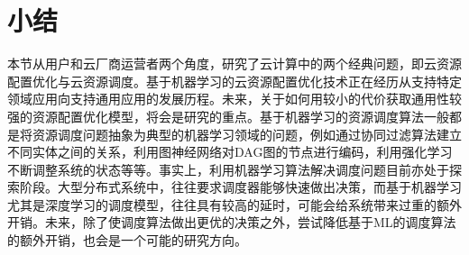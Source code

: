 \section{小结}

本节从用户和云厂商运营者两个角度，研究了云计算中的两个经典问题，即云资源配置优化与云资源调度。基于机器学习的云资源配置优化技术正在经历从支持特定领域应用向支持通用应用的发展历程。未来，关于如何用较小的代价获取通用性较强的资源配置优化模型，将会是研究的重点。基于机器学习的资源调度算法一般都是将资源调度问题抽象为典型的机器学习领域的问题，例如通过协同过滤算法建立不同实体之间的关系，利用图神经网络对DAG图的节点进行编码，利用强化学习不断调整系统的状态等等。事实上，利用机器学习算法解决调度问题目前亦处于探索阶段。大型分布式系统中，往往要求调度器能够快速做出决策，而基于机器学习尤其是深度学习的调度模型，往往具有较高的延时，可能会给系统带来过重的额外开销。未来，除了使调度算法做出更优的决策之外，尝试降低基于ML的调度算法的额外开销，也会是一个可能的研究方向。